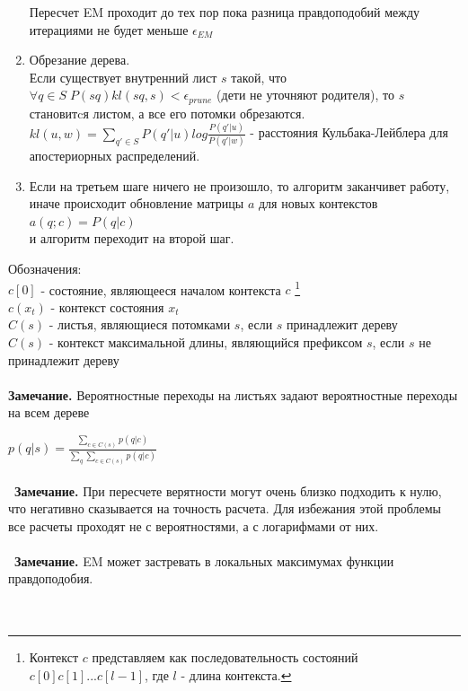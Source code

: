 \documentclass{matmex-diploma-custom}
\begin{document}
\begin{enumerate}
\begin{enumerate}
\end{enumerate}
Пересчет EM проходит до тех пор пока разница правдоподобий между итерациями не будет меньше $ \epsilon_{EM}$
\\
\item Обрезание дерева.
\\
Если существует внутренний лист $ s $ такой, что $ \forall q \in S \; P(sq)kl(sq, s) < \epsilon_{prune} $ (дети не уточняют родителя), то $ s $ становитcя листом, а все его потомки обрезаются.
\\
$kl(u, w) = \sum_{q' \in S} P(q'|u) log\frac{P(q'|u)}{P(q'|w)}$ - расстояния Кульбака-Лейблера для апостериорных распределений.
\\
\item Если на третьем шаге ничего не произошло, то алгоритм заканчивет работу, 
иначе происходит обновление матрицы $ a $ для новых контекстов
\\
$ a(q; c) = P(q| c) $
\\
и алгоритм переходит на второй шаг.
\\
\end{enumerate}
Обозначения: 
\\
$ c[0] $ - состояние, являющееся началом контекста $ c $
\footnote{Контекст $ c $ представляем как последовательность состояний $c[0]c[1]...c[l-1]$, где $ l $ - длина контекста.}
\\
$ c(x_{t}) $ - контекст состояния $ x_{t} $ 
\\
$ C(s) $ - листья, являющиеся потомками $ s $, если $ s $ принадлежит дереву 
\\
$ C(s) $ - контекст максимальной длины, являющийся префиксом $ s $, если $ s $ не принадлежит дереву 
\\\\
\textbf{Замечание.}  Вероятностные переходы на листьях задают вероятностные переходы на всем дереве

$ p(q|s) = \frac{\sum_{c \in C(s)} {p(q|c)}}{\sum_q\sum_{c \in C(s)} {p(q|c)}} $ 
\\\\\
\textbf{Замечание.} При пересчете верятности могут очень близко подходить к нулю, что негативно сказывается на точность расчета. Для избежания этой проблемы все расчеты проходят не с вероятностями, а с логарифмами от них.
\\\\\
\textbf{Замечание.} EM может застревать в локальных максимумах функции правдоподобия.
\\\\\
\end{document}
